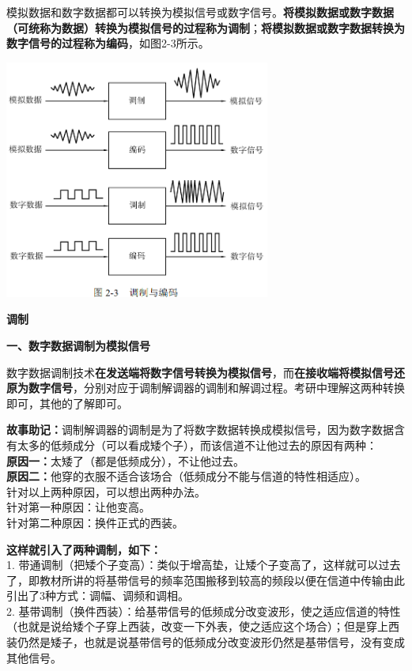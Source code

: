 模拟数据和数字数据都可以转换为模拟信号或数字信号。\textbf{将模拟数据或数字数据（可统称为数据）转换为模拟信号的过程称为调制}；\textbf{将模拟数据或数字数据转换为数字信号的过程称为编码}，如图2-3所示。

\includegraphics[width=3.43750in,height=3.09375in]{png-jpeg-pics/EB621C2074FA45D90973D4B8CA7D451F.png}

\textbf{{调制}}

\textbf{{一、数字数据调制为模拟信号}}

数字数据调制技术\textbf{在发送端将数字信号转换为模拟信号}，而\textbf{在接收端将模拟信号还原为数字信号}，分别对应于调制解调器的调制和解调过程。考研中理解这两种转换即可，其他的了解即可。

{\textbf{故事助记：}调制解调器的调制是为了将数字数据转换成模拟信号，因为数字数据含有太多的低频成分（可以看成矮个子），而该信道不让他过去的原因有两种：}\\
{\textbf{原因一：}太矮了（都是低频成分），不让他过去。}\\
{\textbf{原因二：}他穿的衣服不适合该场合（低频成分不能与信道的特性相适应）。}\\
{针对以上两种原因，可以想出两种办法。}\\
{针对第一种原因：让他变高。}\\
{针对第二种原因：换件正式的西装。}{}

\textbf{这样就引入了两种调制，如下：}\\
1.
带通调制（把矮个子变高）：类似于增高垫，让矮个子变高了，这样就可以过去了，即教材所讲的将基带信号的频率范围搬移到较高的频段以便在信道中传输由此引出了3种方式：调幅、调频和调相。\\
2.
基带调制（换件西装）：给基带信号的低频成分改变波形，使之适应信道的特性（也就是说给矮个子穿上西装，改变一下外表，使之适应这个场合）；但是穿上西装仍然是矮子，也就是说基带信号的低频成分改变波形仍然是基带信号，没有变成其他信号。

